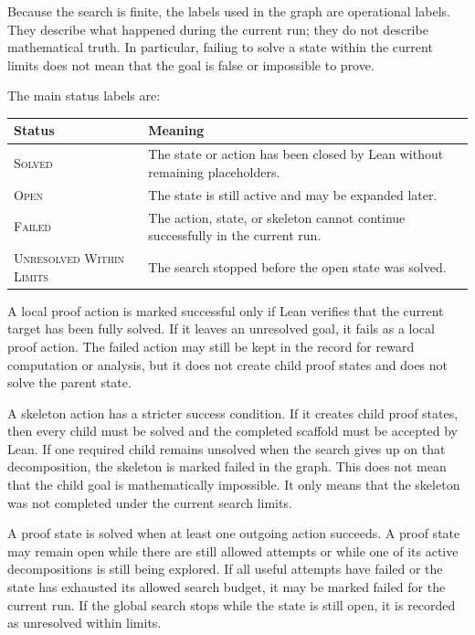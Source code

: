 Because the search is finite, the labels used in the graph are operational labels. They describe what happened during the current run; they do not describe mathematical truth. In particular, failing to solve a state within the current limits does not mean that the goal is false or impossible to prove.

The main status labels are:

\begin{center}
\begin{tabular}{ll}
\hline
\textbf{Status} & \textbf{Meaning} \\
\hline
\textsc{Solved} & The state or action has been closed by Lean without remaining placeholders. \\
\textsc{Open} & The state is still active and may be expanded later. \\
\textsc{Failed} & The action, state, or skeleton cannot continue successfully in the current run. \\
\textsc{Unresolved Within Limits} & The search stopped before the open state was solved. \\
\hline
\end{tabular}
\end{center}

A local proof action is marked successful only if Lean verifies that the current target has been fully solved. If it leaves an unresolved goal, it fails as a local proof action. The failed action may still be kept in the record for reward computation or analysis, but it does not create child proof states and does not solve the parent state.

A skeleton action has a stricter success condition. If it creates child proof states, then every child must be solved and the completed scaffold must be accepted by Lean. If one required child remains unsolved when the search gives up on that decomposition, the skeleton is marked failed in the graph. This does not mean that the child goal is mathematically impossible. It only means that the skeleton was not completed under the current search limits.

A proof state is solved when at least one outgoing action succeeds. A proof state may remain open while there are still allowed attempts or while one of its active decompositions is still being explored. If all useful attempts have failed or the state has exhausted its allowed search budget, it may be marked failed for the current run. If the global search stops while the state is still open, it is recorded as unresolved within limits.

